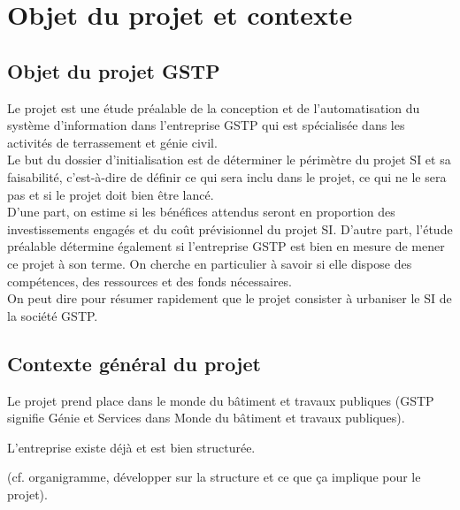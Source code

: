 \section{Objet du projet et contexte}

\subsection{Objet du projet GSTP}
Le projet est une étude préalable de la conception et de l'automatisation
du système d'information dans l'entreprise GSTP qui est spécialisée dans
les activités de terrassement et génie civil.\\

Le but du dossier d'initialisation est de déterminer le périmètre du projet
SI et sa faisabilité, c’est-à-dire de définir ce qui sera inclu
dans le projet, ce qui ne le sera pas et si le projet doit bien être
lancé.\\

D’une part, on estime si les bénéfices attendus seront en proportion des
investissements engagés et du coût prévisionnel du projet SI.  D’autre
part, l’étude préalable détermine également si l’entreprise GSTP est
bien en mesure de mener ce projet à son terme. On cherche en particulier
à savoir si elle dispose des compétences, des ressources et des fonds
nécessaires.\\

On peut dire pour résumer rapidement que le projet consister à urbaniser le
SI de la société GSTP.

\subsection{Contexte général du projet}

Le projet prend place dans le monde du bâtiment et travaux publiques (GSTP
signifie Génie et Services dans Monde du bâtiment et travaux publiques).

L'entreprise existe déjà et est bien structurée. 

(cf. organigramme, développer
sur la structure et ce que ça implique pour le projet). 

